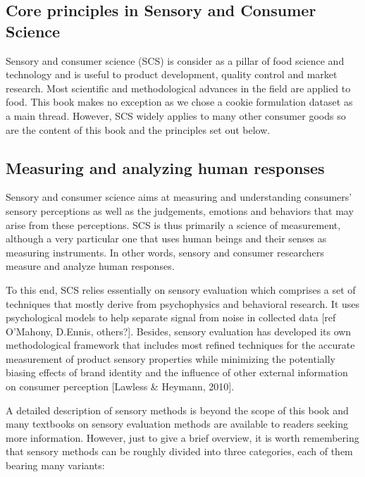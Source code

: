 \documentclass[
]{book}
\begin{document}
\hypertarget{core-principles-in-sensory-and-consumer-science}{%
\subsection*{Core principles in Sensory and Consumer Science}\label{core-principles-in-sensory-and-consumer-science}}

Sensory and consumer science (SCS) is consider as a pillar of food science and technology and is useful to product development, quality control and market research. Most scientific and methodological advances in the field are applied to food. This book makes no exception as we chose a cookie formulation dataset as a main thread. However, SCS widely applies to many other consumer goods so are the content of this book and the principles set out below.

\hypertarget{measuring-and-analyzing-human-responses}{%
\subsection*{Measuring and analyzing human responses}\label{measuring-and-analyzing-human-responses}}

Sensory and consumer science aims at measuring and understanding consumers' sensory perceptions as well as the judgements, emotions and behaviors that may arise from these perceptions. SCS is thus primarily a science of measurement, although a very particular one that uses human beings and their senses as measuring instruments. In other words, sensory and consumer researchers measure and analyze human responses.

To this end, SCS relies essentially on sensory evaluation which comprises a set of techniques that mostly derive from psychophysics and behavioral research. It uses psychological models to help separate signal from noise in collected data {[}ref O'Mahony, D.Ennis, others?{]}. Besides, sensory evaluation has developed its own methodological framework that includes most refined techniques for the accurate measurement of product sensory properties while minimizing the potentially biasing effects of brand identity and the influence of other external information on consumer perception {[}Lawless \& Heymann, 2010{]}.

A detailed description of sensory methods is beyond the scope of this book and many textbooks on sensory evaluation methods are available to readers seeking more information. However, just to give a brief overview, it is worth remembering that sensory methods can be roughly divided into three categories, each of them bearing many variants:
\end{document}
